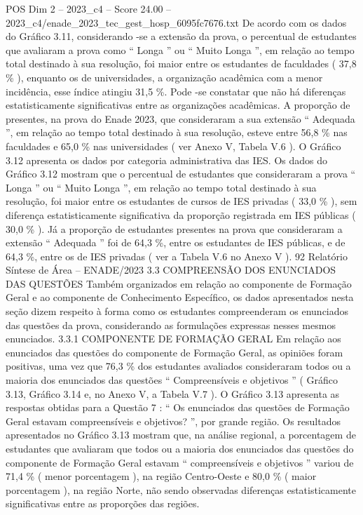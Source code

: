 \begin{textsample}{POS Dim 2 – 2023\_c4 – Score 24.00 – 2023\_c4/enade\_2023\_tec\_gest\_hosp\_6095fc7676.txt}
De acordo com os dados do Gráfico 3.11, considerando -se a extensão da prova, o percentual de estudantes que avaliaram a prova como “ Longa ” ou “ Muito Longa ”, em relação ao tempo total destinado à sua resolução, foi maior entre os estudantes de faculdades ( 37,8 \% ), enquanto os de universidades, a organização acadêmica com a menor incidência, esse índice atingiu 31,5 \%.
Pode -se constatar que não há diferenças estatisticamente significativas entre as organizações acadêmicas.
A proporção de presentes, na prova do Enade 2023, que consideraram a sua extensão “ Adequada ”, em relação ao tempo total destinado à sua resolução, esteve entre 56,8 \% nas faculdades e 65,0 \% nas universidades ( ver Anexo V, Tabela V.6 ).
O Gráfico 3.12 apresenta os dados por categoria administrativa das IES.
Os dados do Gráfico 3.12 mostram que o percentual de estudantes que consideraram a prova “ Longa ” ou “ Muito Longa ”, em relação ao tempo total destinado à sua resolução, foi maior entre os estudantes de cursos de IES privadas ( 33,0 \% ), sem diferença estatisticamente significativa da proporção registrada em IES públicas ( 30,0 \% ).
Já a proporção de estudantes presentes na prova que consideraram a extensão “ Adequada ” foi de 64,3 \%, entre os estudantes de IES públicas, e de 64,3 \%, entre os de IES privadas ( ver a Tabela V.6 no Anexo V ). 92 Relatório Síntese de Área – ENADE/2023 3.3 COMPREENSÃO DOS ENUNCIADOS DAS QUESTÕES Também organizados em relação ao componente de Formação Geral e ao componente de Conhecimento Específico, os dados apresentados nesta seção dizem respeito à forma como os estudantes compreenderam os enunciados das questões da prova, considerando as formulações expressas nesses mesmos enunciados. 3.3.1 COMPONENTE DE FORMAÇÃO GERAL Em relação aos enunciados das questões do componente de Formação Geral, as opiniões foram positivas, uma vez que 76,3 \% dos estudantes avaliados consideraram todos ou a maioria dos enunciados das questões “ Compreensíveis e objetivos ” ( Gráfico 3.13, Gráfico 3.14 e, no Anexo V, a Tabela V.7 ).
O Gráfico 3.13 apresenta as respostas obtidas para a Questão 7 : “ Os enunciados das questões de Formação Geral estavam compreensíveis e objetivos? ”, por grande região.
Os resultados apresentados no Gráfico 3.13 mostram que, na análise regional, a porcentagem de estudantes que avaliaram que todos ou a maioria dos enunciados das questões do componente de Formação Geral estavam “ compreensíveis e objetivos ” variou de 71,4 \% ( menor porcentagem ), na região Centro-Oeste e 80,0 \% ( maior porcentagem ), na região Norte, não sendo observadas diferenças estatisticamente significativas entre as proporções das regiões.

\end{textsample}
